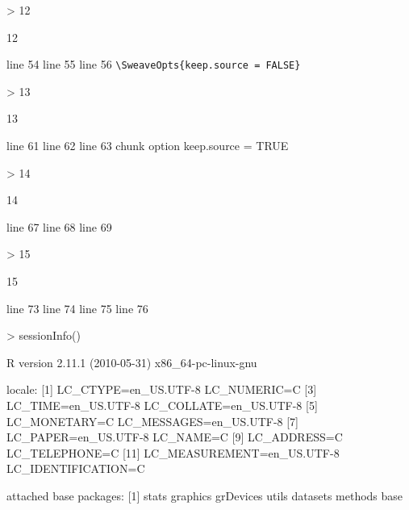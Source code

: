 \documentclass[english, a4paper, 10pt, headings=small, DIV11]{scrartcl}
\begin{document}
\begin{Schunk}
\begin{Sinput}
> 12
\end{Sinput}
\begin{Soutput}
[1] 12
\end{Soutput}
\end{Schunk}
line 54 
line 55 
line 56 
\verb+\SweaveOpts{keep.source = FALSE}+
\begin{Schunk}
\begin{Sinput}
> 13
\end{Sinput}
\begin{Soutput}
[1] 13
\end{Soutput}
\end{Schunk}
line 61 
line 62
line 63 chunk option keep.source = TRUE
\begin{Schunk}
\begin{Sinput}
> 14
\end{Sinput}
\begin{Soutput}
[1] 14
\end{Soutput}
\end{Schunk}
line 67
line 68
line 69
\begin{Schunk}
\begin{Sinput}
> 15
\end{Sinput}
\begin{Soutput}
[1] 15
\end{Soutput}
\end{Schunk}
line 73
line 74
line 75
line 76
\begin{Schunk}
\begin{Sinput}
> sessionInfo()
\end{Sinput}
\begin{Soutput}
R version 2.11.1 (2010-05-31) 
x86_64-pc-linux-gnu 

locale:
 [1] LC_CTYPE=en_US.UTF-8       LC_NUMERIC=C              
 [3] LC_TIME=en_US.UTF-8        LC_COLLATE=en_US.UTF-8    
 [5] LC_MONETARY=C              LC_MESSAGES=en_US.UTF-8   
 [7] LC_PAPER=en_US.UTF-8       LC_NAME=C                 
 [9] LC_ADDRESS=C               LC_TELEPHONE=C            
[11] LC_MEASUREMENT=en_US.UTF-8 LC_IDENTIFICATION=C       

attached base packages:
[1] stats     graphics  grDevices utils     datasets  methods   base     
\end{Soutput}
\end{Schunk}
\end{document}
